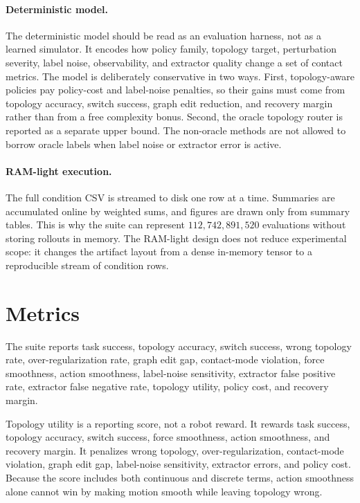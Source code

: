 \documentclass{article}
\begin{document}
\paragraph{Deterministic model.}
The deterministic model should be read as an evaluation harness, not as a learned simulator. It encodes how policy family, topology target, perturbation severity, label noise, observability, and extractor quality change a set of contact metrics. The model is deliberately conservative in two ways. First, topology-aware policies pay policy-cost and label-noise penalties, so their gains must come from topology accuracy, switch success, graph edit reduction, and recovery margin rather than from a free complexity bonus. Second, the oracle topology router is reported as a separate upper bound. The non-oracle methods are not allowed to borrow oracle labels when label noise or extractor error is active.

\paragraph{RAM-light execution.}
The full condition CSV is streamed to disk one row at a time. Summaries are accumulated online by weighted sums, and figures are drawn only from summary tables. This is why the suite can represent $112,742,891,520$ evaluations without storing rollouts in memory. The RAM-light design does not reduce experimental scope: it changes the artifact layout from a dense in-memory tensor to a reproducible stream of condition rows.

\section{Metrics}

The suite reports task success, topology accuracy, switch success, wrong topology rate, over-regularization rate, graph edit gap, contact-mode violation, force smoothness, action smoothness, label-noise sensitivity, extractor false positive rate, extractor false negative rate, topology utility, policy cost, and recovery margin.

Topology utility is a reporting score, not a robot reward. It rewards task success, topology accuracy, switch success, force smoothness, action smoothness, and recovery margin. It penalizes wrong topology, over-regularization, contact-mode violation, graph edit gap, label-noise sensitivity, extractor errors, and policy cost. Because the score includes both continuous and discrete terms, action smoothness alone cannot win by making motion smooth while leaving topology wrong.
\end{document}
